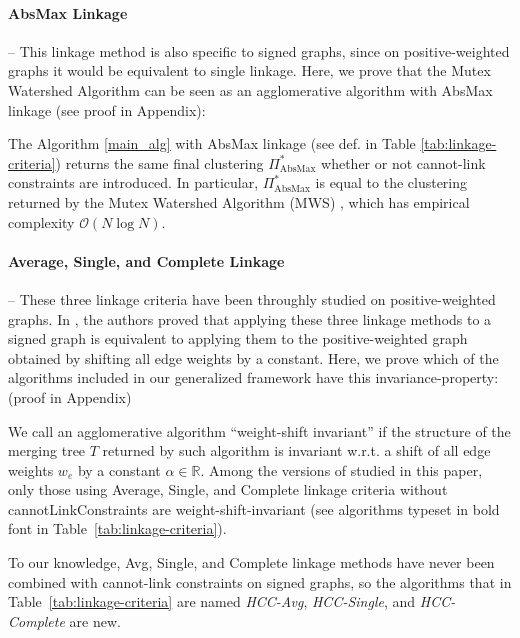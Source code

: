 \paragraph{AbsMax Linkage} -- This linkage method is also specific to signed graphs, since on positive-weighted graphs it would be equivalent to single linkage. Here, we prove that the Mutex Watershed Algorithm \cite{wolf2018mutex} can be seen as an agglomerative algorithm with AbsMax linkage (see proof in Appendix):
\begin{prop} 
The \algname{} Algorithm \ref{main_alg} with AbsMax linkage (see def. in Table \ref{tab:linkage-criteria}) returns the same final clustering $\Pi^*_{\mathrm{AbsMax}}$ whether or not cannot-link constraints are introduced. In particular, $\Pi^*_{\mathrm{AbsMax}}$ is equal to the clustering returned by the Mutex Watershed Algorithm (MWS) \cite{wolf2018mutex}, which has empirical complexity $\mathcal{O}(N \log N)$. 
\end{prop}


\paragraph{Average, Single, and Complete Linkage} -- These three linkage criteria have been throughly studied on positive-weighted graphs. In \cite{chehreghani2020hierarchical}, the authors proved that applying these three linkage methods to a signed graph is equivalent to applying them to the positive-weighted graph obtained by shifting all edge weights by a constant.  Here, we prove which of the algorithms included in our generalized framework have this invariance-property: (proof in Appendix)
\begin{prop} \label{prop:weight_shift_invariant}
We call an agglomerative algorithm ``weight-shift invariant'' if the structure of the merging tree $T$ returned by such algorithm is invariant w.r.t. a shift of all edge weights $w_e$  by a constant $\alpha\in \mathbb{R}$. Among the versions of \algname{} studied in this paper, only those using Average, Single, and Complete linkage criteria without cannotLinkConstraints are weight-shift-invariant (see algorithms typeset in bold font in Table~\ref{tab:linkage-criteria}).
\end{prop}
\noindent To our knowledge, Avg, Single, and Complete linkage methods have never been combined with cannot-link constraints on signed graphs, so the algorithms that in Table~\ref{tab:linkage-criteria} are named \emph{HCC-Avg}, \emph{HCC-Single}, and \emph{HCC-Complete} are new.


